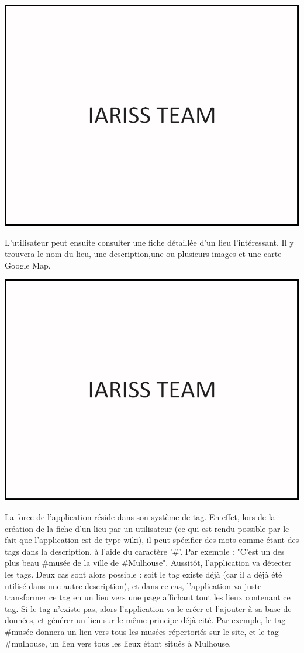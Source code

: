 \documentclass[12pt, a4paper]{article}
\newcommand{\espace}{\vspace{.8cm}}
\begin{document}
\espace{}
\includegraphics{img/test.png}

\espace{}
L'utilisateur peut ensuite consulter une fiche détaillée d'un lieu l'intéressant. Il y trouvera le nom du lieu, une description,une ou plusieurs images et une carte Google Map.

\espace{}
\includegraphics{img/test.png}

\espace{}
La force de l'application réside dans son système de tag. En effet, lors de la création de la fiche d'un lieu par un utilisateur (ce qui est rendu possible par le fait que l'application est de type wiki), il peut spécifier des mots comme étant des tags dans la description, à l'aide du caractère '#'. Par exemple : "C'est un des plus beau #musée de la ville de #Mulhouse". Aussitôt, l'application va détecter les tags. Deux cas sont alors possible : soit le tag existe déjà (car il a déjà été utilisé dans une autre description), et dans ce cas, l'application va juste transformer ce tag en un lieu vers une page affichant tout les lieux contenant ce tag. Si le tag n'existe pas, alors l'application va le créer et l'ajouter à sa base de données, et générer un lien sur le même principe déjà cité. Par exemple, le tag #musée donnera un lien vers tous les musées répertoriés sur le site, et le tag #mulhouse, un lien vers tous les lieux étant situés à Mulhouse.
\end{document}
